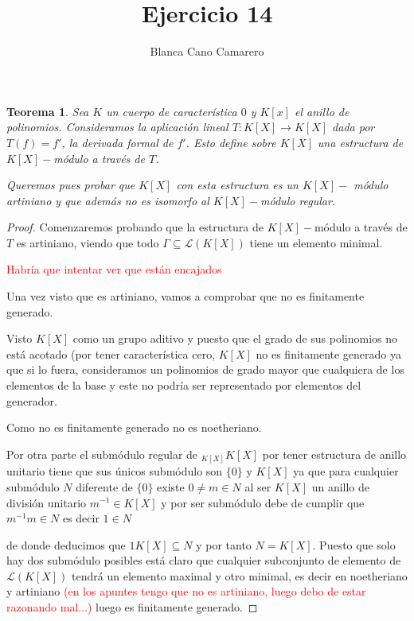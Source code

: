 \documentclass{article}
\title{Ejercicio 14}
\author{Blanca Cano Camarero}
\newtheorem*{teorema*}{Teorema}
\newcommand{\K}{K[X]}
\begin{document}
\maketitle

\begin{teorema*}
    Sea $K$ un cuerpo de característica $0$ y $K[x]$ el anillo de polinomios. Consideramos la aplicación lineal $T: K[X] \longrightarrow K[X]$ 
    dada por $T(f) = f'$, 
    la derivada formal de $f'$.
    Esto define sobre $K[X]$ una estructura de $K[X]-$módulo a través de $T$. 

    Queremos pues probar que $K[X]$ con esta estructura es un $K[X]-$ módulo artiniano y que además no es isomorfo al $K[X]-$módulo regular.
\end{teorema*}   

\begin{proof}
    Comenzaremos probando que la estructura de $K[X]-$módulo a través de $T$ es artiniano, viendo que todo 
    $\Gamma \subseteq \mathcal{L}(K[X])$ tiene un elemento minimal.

    \textcolor{red}{Habría que intentar ver que están encajados}
    
    Una vez visto que es artiniano, vamos a comprobar que no es finitamente generado. 
    
    Visto $K[X]$ como un grupo aditivo y puesto que el grado de sus polinomios no está acotado (por tener característica cero,
    $K[X]$ no es finitamente generado
    ya que si lo fuera, consideramos un polinomios de grado mayor que cualquiera de los elementos de la base y este no podría ser representado por elementos del generador.
 
    Como no es finitamente generado no es noetheriano.


    Por otra parte  el submódulo regular de ${_{\K}}\K$ por tener estructura de anillo unitario tiene que sus únicos submódulo son $\{0\}$ y $\K$ 
    ya que para cualquier submódulo $N$ diferente de $\{0\}$ 
    existe $0 \neq m \in N$ al ser $\K$ un anillo de división unitario $m^{-1} \in \K$
    y por ser submódulo debe de cumplir que $m^{-1} m \in N$
    es decir $1 \in N$

    de donde deducimos que $1 \K \subseteq N$ y por tanto $N=\K$. 
    Puesto que solo hay dos submódulo posibles está claro que cualquier subconjunto de elemento de $\mathcal{L}(\K)$ tendrá
    un elemento maximal y otro minimal, es decir en noetheriano y artiniano \textcolor{red}{(en los apuntes tengo que no es artiniano, luego debo de estar razonando mal...)} 
    luego es finitamente generado. 


\end{proof}
\end{document}
